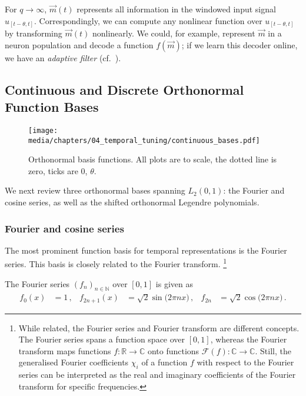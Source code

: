 For $q \to \infty$, $\vec m(t)$ represents all information in the windowed input signal $u_{[t - \theta, t]}$.
Correspondingly, we can compute any nonlinear function over $u_{[t - \theta, t]}$ by transforming $\vec m(t)$ nonlinearly.
We could, for example, represent $\vec m$ in a neuron population and decode a function $f(\vec m)$; if we learn this decoder online, we have an \emph{adaptive filter} (cf.~).

\subsection{Continuous and Discrete Orthonormal Function Bases}
\label{sec:function_bases}

\begin{figure}
	\texttt{[image: media/chapters/04\_temporal\_tuning/continuous\_bases.pdf]}%
	{\label{fig:fourier_series}}%
	{\label{fig:cosine_series}}%
	{\label{fig:legendre_series}}%
	\caption[Orthonormal basis functions]{
	Orthonormal basis functions. All plots are to scale, the dotted line is zero, ticks are $0$, $\theta$.}
\end{figure}

We next review three orthonormal bases spanning $L_2(0, 1)$: the Fourier and cosine series, as well as the shifted orthonormal Legendre polynomials.

\subsubsection{Fourier and cosine series}
The most prominent function basis for temporal representations is the Fourier series. This basis is closely related to the Fourier transform.%
\footnote{While related, the Fourier series and Fourier transform are different concepts.
The Fourier series spans a function space over $[0, 1]$, whereas the Fourier transform maps functions $f : \mathbb{R} \longrightarrow \mathbb{C}$ onto functions $\mathcal{F}(f) : \mathbb{C} \longrightarrow \mathbb{C}$.
Still, the generalised Fourier coefficients $\chi_i$ of a function $f$ with respect to the Fourier series can be interpreted as the real and imaginary coefficients of the Fourier transform for specific frequencies.}

\begin{definition}

The Fourier series $(f_n)_{n \in \mathbb{N}}$ over $[0, 1]$ is given as
\begin{align}
		f_0(x) &= 1 \,,&
		f_{2n + 1}(x) &= \sqrt{2}\sin\bigl(2 \pi nx\bigr) \,, &
		f_{2n} &= \sqrt{2}\cos\bigl(2 \pi nx\bigr) \,.
		\label{eqn:fourier_series}
	\end{align}
\end{definition}

